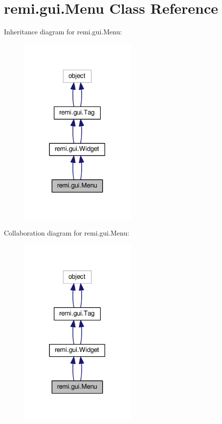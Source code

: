 \hypertarget{classremi_1_1gui_1_1Menu}{}\section{remi.\+gui.\+Menu Class Reference}
\label{classremi_1_1gui_1_1Menu}


Inheritance diagram for remi.\+gui.\+Menu\+:
\nopagebreak
\begin{figure}[H]
\begin{center}
\leavevmode
\includegraphics[width=165pt]{db/de0/classremi_1_1gui_1_1Menu__inherit__graph}
\end{center}
\end{figure}


Collaboration diagram for remi.\+gui.\+Menu\+:
\nopagebreak
\begin{figure}[H]
\begin{center}
\leavevmode
\includegraphics[width=165pt]{d5/ded/classremi_1_1gui_1_1Menu__coll__graph}
\end{center}
\end{figure}
